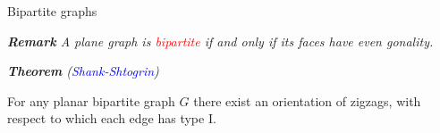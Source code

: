 \documentclass[%
pdf,
colorBG,
slideColor,
]{prosper}
\begin{document}
\begin{slide}{Bipartite graphs}

\vspace{-2mm}

{\em {\bf Remark}
A plane graph is \textcolor{red}{bipartite} if and only if its faces have even gonality.
}



{\em {\bf Theorem} (\textcolor{blue}{Shank-Shtogrin})

For any planar bipartite graph $G$ there exist an orientation of zigzags, with respect to which each edge has type I.
}


\begin{center}
\begin{minipage}{5.5cm}
\end{minipage}
\begin{minipage}{3cm}
\end{minipage}
\end{center}

\end{slide}
\end{document}

